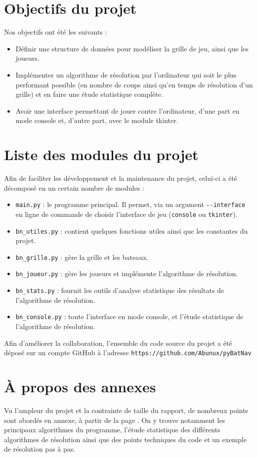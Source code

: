 \section{Objectifs du projet}
Nos objectifs ont été les suivants :
\begin{itemize}
\item Définir une structure de données pour modéliser la grille de jeu, ainsi que les joueurs.
\item Implémenter un algorithme de résolution par l'ordinateur qui soit le plus performant possible (en nombre de coups ainsi qu'en temps de résolution d'un grille) et en faire une étude statistique complète.
\item Avoir une interface permettant de jouer contre l'ordinateur, d'une part en mode console et, d'autre part, avec le module tkinter. 
\end{itemize}

\section{Liste des modules du projet}
Afin de faciliter les développement et la maintenance du projet, celui-ci a été décomposé en un certain nombre de modules :
\begin{itemize}
\item \texttt{main.py} : le programme principal. Il permet, via un argument \texttt{-\hspace*{1pt}-interface} en ligne de commande de choisir l'interface de jeu (\texttt{console} ou \texttt{tkinter}).
\item \texttt{bn\_utiles.py} : contient quelques fonctions utiles ainsi que les constantes du projet.
\item \texttt{bn\_grille.py} : gère la grille et les bateaux.
\item \texttt{bn\_joueur.py} : gère les joueurs et implémente l'algorithme de résolution.
\item \texttt{bn\_stats.py} : fournit les outils d'analyse statistique des résultats de l'algorithme de résolution.
\item \texttt{bn\_console.py} : toute l'interface en mode console, et l'étude statistique de l'algorithme de résolution.
\end{itemize}

\bigskip

Afin d'améliorer la collaboration, l'ensemble du code source du projet a été déposé sur un compte GitHub à l'adresse \texttt{https://github.com/Abunux/pyBatNav}

\section{À propos des annexes}
Vu l'ampleur du projet et la contrainte de taille du rapport, de nombreux points sont abordés en annexe, à partir de la page \pageref{annexes}. On y trouve notamment les principaux algorithmes du programme, l'étude statistique des différents algorithmes de résolution ainsi que des points techniques du code et un exemple de résolution pas à pas.
